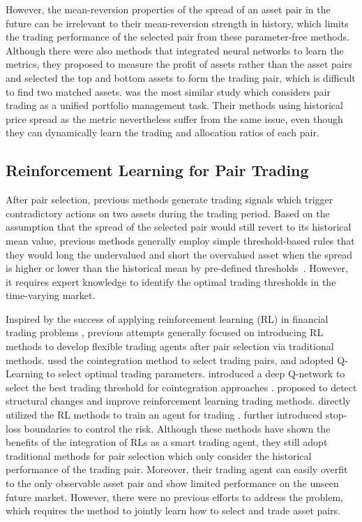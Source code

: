 \documentclass[sigconf]{acmart}
\begin{document}
However, the mean-reversion properties of the spread of an asset pair in the future can be irrelevant to their mean-reversion strength in history, which limits the trading performance of the selected pair from these parameter-free methods.
Although there were also methods \cite{Krauss2017DeepNN} that integrated neural networks to learn the metrics, they proposed to measure the profit of assets rather than the asset pairs and selected the top and bottom assets to form the trading pair, which is difficult to find two matched assets.
\cite{Xu2020DynamicPM} was the most similar study which considers pair trading as a unified portfolio management task.
Their methods using historical price spread as the metric nevertheless suffer from the same issue, even though they can dynamically learn the trading and allocation ratios of each pair.

\subsection{Reinforcement Learning for Pair Trading}
After pair selection, previous methods generate trading signals which trigger contradictory actions on two assets during the trading period.
Based on the assumption that the spread of the selected pair would still revert to its historical mean value, previous methods generally employ simple threshold-based rules that they would long the undervalued and short the overvalued asset when the spread is higher or lower than the historical mean by pre-defined thresholds~\cite{Krauss2017}.
However, it requires expert knowledge to identify the optimal trading thresholds in the time-varying market.

Inspired by the success of applying reinforcement learning (RL) in financial trading problems \cite{fischer2018reinforcement}, 
previous attempts generally focused on introducing RL methods to develop flexible trading agents after pair selection via traditional methods.
\cite{fallahpour2016pairs} used the cointegration method to select trading pairs, and adopted Q-Learning \cite{watkins1992q} to select optimal trading parameters.
\citeauthor{kim2019optimizing} introduced a deep Q-network \cite{mnih2015human} to select the best trading threshold for cointegration approaches \cite{kim2019optimizing}.
\cite{Lu2022StructuralBP} proposed to detect structural changes and improve reinforcement learning trading methods.
\citeauthor{wang2021improving,Brim2020DeepRL} directly utilized the RL methods to train an agent for trading \cite{wang2021improving,Brim2020DeepRL}.
\cite{Kim2022HybridDR} further introduced stop-loss boundaries to control the risk.
Although these methods have shown the benefits of the integration of RLs as a smart trading agent, they still adopt traditional methods for pair selection which only consider the historical performance of the trading pair.
Moreover, their trading agent can easily overfit to the only observable asset pair and show limited performance on the unseen future market.
However, there were no previous efforts to address the problem, which requires the method to jointly learn how to select and trade asset pairs.
\end{document}
